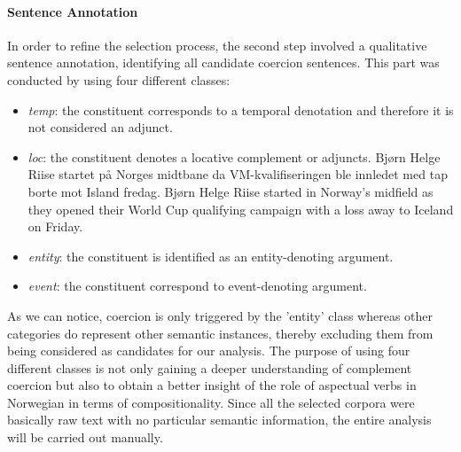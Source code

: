 \documentclass{article}
\begin{document}
\paragraph{Sentence Annotation}
In order to refine the selection process, the second step involved a qualitative sentence annotation, identifying all candidate coercion sentences. This part was conducted by using four different classes:
\begin{itemize}
    \item \textit{temp}: the constituent corresponds to a temporal denotation and therefore it is not considered an adjunct. 
    \item \textit{loc}: the constituent denotes a locative complement or adjuncts.  Bjørn Helge Riise startet på Norges midtbane da VM-kvalifiseringen ble innledet med tap borte mot Island fredag. Bjørn Helge Riise started in Norway's midfield as they opened their World Cup qualifying campaign with a loss away to Iceland on Friday.
    \item \textit{entity}: the constituent is identified as  an entity-denoting argument.
    \item \textit{event}: the constituent correspond to event-denoting argument.
\end{itemize}
As we can notice, coercion is only triggered by the 'entity' class whereas other categories do represent other semantic instances, thereby excluding them from being considered as candidates for our analysis. The purpose of using four different classes is not only gaining a deeper understanding of complement coercion but also to obtain a better insight of the role of aspectual verbs in Norwegian in terms of compositionality. Since all the selected corpora were basically raw text with no particular semantic information, the entire analysis will be carried out manually. 



\end{document}
